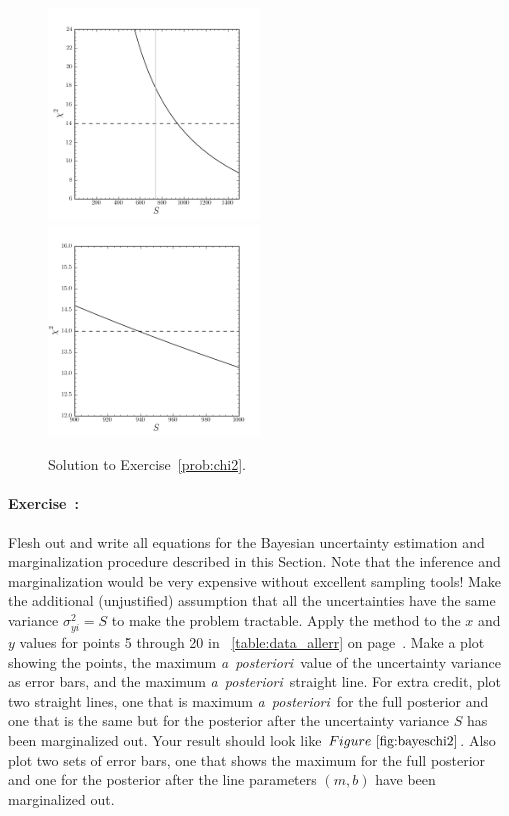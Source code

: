 \documentclass[12pt,twoside]{article}
\newcommand{\notenglish}[1]{\textsl{#1}}
\newcommand{\aposteriori}{\notenglish{a~posteriori}}
\newcommand{\sectionname}{Section}
\newcommand{\problemname}{Exercise}
\newcounter{problem}
\newenvironment{problem}{\paragraph{\problemname~\theproblem:}\refstepcounter{problem}}{}
\begin{document}
\begin{figure}[htb]
\includegraphics[width=0.5\textwidth]{ex9.png}
\includegraphics[width=0.5\textwidth]{ex9b.png}
\caption{Solution to \problemname~\ref{prob:chi2}.}\label{fig:chi2}
\end{figure}

\begin{problem}\label{prob:bayeschi2}
Flesh out and write all equations for the Bayesian uncertainty
estimation and marginalization procedure described in this
\sectionname.  Note that the inference and marginalization would be
very expensive without excellent sampling tools!  Make the additional
(unjustified) assumption that all the uncertainties have the same
variance $\sigma_{yi}^2=S$ to make the problem tractable.  Apply the
method to the $x$ and $y$ values for points 5 through 20 in
\tablename~\ref{table:data_allerr} on
page~\pageref{table:data_allerr}.  Make a plot showing the points, the
maximum \aposteriori\ value of the uncertainty variance as error bars,
and the maximum \aposteriori\ straight line.  For extra credit, plot
two straight lines, one that is maximum \aposteriori\ for the full
posterior and one that is the same but for the posterior after the
uncertainty variance $S$ has been marginalized out.  Your result
should look like $\figurename~\ref{fig:bayeschi2}$.  Also plot two
sets of error bars, one that shows the maximum for the full posterior
and one for the posterior after the line parameters $(m,b)$ have been
marginalized out.
\end{problem}
\end{document}
